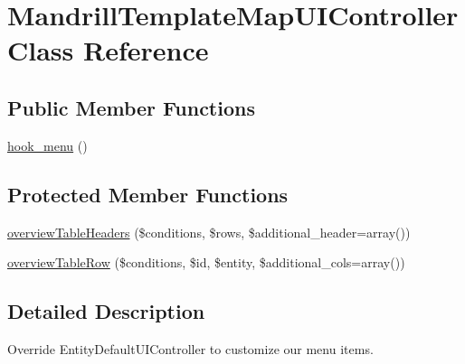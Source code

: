 \hypertarget{classMandrillTemplateMapUIController}{
\section{MandrillTemplateMapUIController Class Reference}
\label{classMandrillTemplateMapUIController}
}
\subsection*{Public Member Functions}
\begin{DoxyCompactItemize}
\item 
\hyperlink{classMandrillTemplateMapUIController_a2a8247480b6adee6a713f059dcda0f3c}{hook\_\-menu} ()
\end{DoxyCompactItemize}
\subsection*{Protected Member Functions}
\begin{DoxyCompactItemize}
\item 
\hyperlink{classMandrillTemplateMapUIController_af04e2a9195b76ab516f8087a4408052b}{overviewTableHeaders} (\$conditions, \$rows, \$additional\_\-header=array())
\item 
\hyperlink{classMandrillTemplateMapUIController_a4f326c7f1cc320a2c4d237df4f05a326}{overviewTableRow} (\$conditions, \$id, \$entity, \$additional\_\-cols=array())
\end{DoxyCompactItemize}


\subsection{Detailed Description}
Override EntityDefaultUIController to customize our menu items. 

